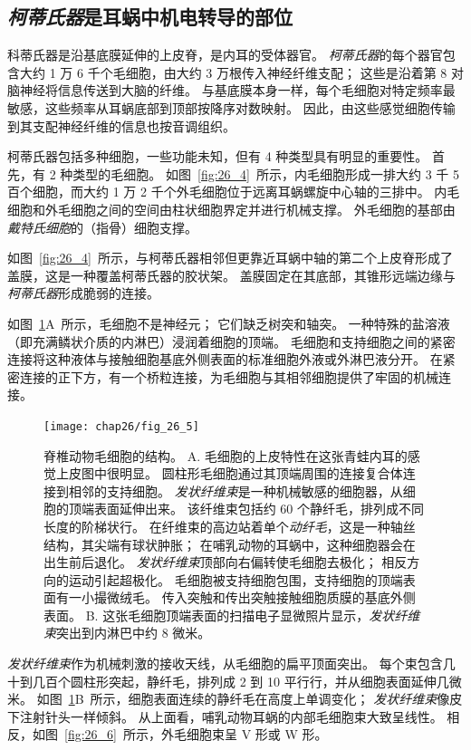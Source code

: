 \subsection{\textit{柯蒂氏器}是耳蜗中机电转导的部位}

科蒂氏器是沿基底膜延伸的上皮脊，是内耳的受体器官。
\textit{柯蒂氏器}的每个器官包含大约 1 万 6 千个毛细胞，由大约 3 万根传入神经纤维支配；
这些是沿着第 8 对脑神经将信息传送到大脑的纤维。
与基底膜本身一样，每个毛细胞对特定频率最敏感，这些频率从耳蜗底部到顶部按降序对数映射。
因此，由这些感觉细胞传输到其支配神经纤维的信息也按音调组织。


柯蒂氏器包括多种细胞，一些功能未知，但有 4 种类型具有明显的重要性。
首先，有 2 种类型的毛细胞。
如图~\ref{fig:26_4}~所示，内毛细胞形成一排大约 3 千 5 百个细胞，而大约 1 万 2 千个外毛细胞位于远离耳蜗螺旋中心轴的三排中。
内毛细胞和外毛细胞之间的空间由柱状细胞界定并进行机械支撑。
外毛细胞的基部由\textit{戴特氏细胞}的（指骨）细胞支撑。


如图~\ref{fig:26_4}~所示，与柯蒂氏器相邻但更靠近耳蜗中轴的第二个上皮脊形成了盖膜，这是一种覆盖柯蒂氏器的胶状架。
盖膜固定在其底部，其锥形远端边缘与\textit{柯蒂氏器}形成脆弱的连接。


如图~\ref{fig:26_5}A~所示，毛细胞不是神经元；
它们缺乏树突和轴突。
一种特殊的盐溶液（即充满鳞状介质的内淋巴）浸润着细胞的顶端。
毛细胞和支持细胞之间的紧密连接将这种液体与接触细胞基底外侧表面的标准细胞外液或外淋巴液分开。
在紧密连接的正下方，有一个桥粒连接，为毛细胞与其相邻细胞提供了牢固的机械连接。


\begin{figure}[htbp]
	\centering
	\texttt{[image: chap26/fig\_26\_5]}
	\caption{脊椎动物毛细胞的结构。
		A. 毛细胞的上皮特性在这张青蛙内耳的感觉上皮图中很明显。
		圆柱形毛细胞通过其顶端周围的连接复合体连接到相邻的支持细胞。
		\textit{发状纤维束}是一种机械敏感的细胞器，从细胞的顶端表面延伸出来。
		该纤维束包括约 60 个静纤毛，排列成不同长度的阶梯状行。
		在纤维束的高边站着单个\textit{动纤毛}，这是一种轴丝结构，其尖端有球状肿胀；
		在哺乳动物的耳蜗中，这种细胞器会在出生前后退化。
		\textit{发状纤维束}顶部向右偏转使毛细胞去极化；
		相反方向的运动引起超极化。
		毛细胞被支持细胞包围，支持细胞的顶端表面有一小撮微绒毛。
		传入突触和传出突触接触细胞质膜的基底外侧表面。
		B. 这张毛细胞顶端表面的扫描电子显微照片显示，\textit{发状纤维束}突出到内淋巴中约 8 微米。}
	\label{fig:26_5}
\end{figure}


\textit{发状纤维束}作为机械刺激的接收天线，从毛细胞的扁平顶面突出。
每个束包含几十到几百个圆柱形突起，静纤毛，排列成 2 到 10 平行行，并从细胞表面延伸几微米。
如图~\ref{fig:26_5}B~所示，细胞表面连续的静纤毛在高度上单调变化；
\textit{发状纤维束}像皮下注射针头一样倾斜。
从上面看，哺乳动物耳蜗的内部毛细胞束大致呈线性。 
相反，如图~\ref{fig:26_6}~所示，外毛细胞束呈 V 形或 W 形。


